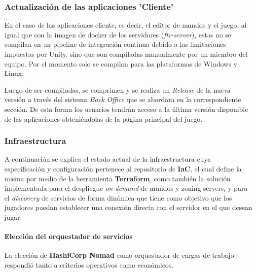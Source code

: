\subsubsection{Actualización de las aplicaciones 'Cliente'}

En el caso de las aplicaciones cliente, es decir, el editor de mundos y el juego, al igual que con la imagen 
de docker de los servidores (\textit{ftr-server}), estas no se compilan en un pipeline de integración continua 
debido a las limitaciones impuestas por Unity, sino que son compiladas manualmente por un miembro del equipo. 
Por el momento solo se compilan para las plataformas de Windows y Linux.

\vspace{0.25cm}

Luego de ser compiladas, se comprimen y se realiza un \textit{Release} de la nueva versión a través del sistema \textit{Back Office} que se abordara en la correspondiente sección.
De esta forma los usuarios tendrán acceso a la última versión disponible de las aplicaciones obteniéndolas de la página principal del juego.

\subsubsection{Infraestructura}

A continuación se explica el estado actual de la infraestructura cuya especificación y configuración pertenece al repositorio
de \textbf{IaC}, el cual define la misma por medio de la herramienta \textbf{Terraform}, como también la solución implementada para el despliegue
\textit{on-demand} de mundos y zoning servers, y para el \textit{discovery} de servicios de forma dinámica que tiene
como objetivo que los jugadores puedan establecer una conexión directa con el servidor en el que desean jugar.

\paragraph{Elección del orquestador de servicios}

La elección de \textbf{HashiCorp Nomad} como orquestador de cargas de trabajo respondió tanto a criterios operativos como económicos.

